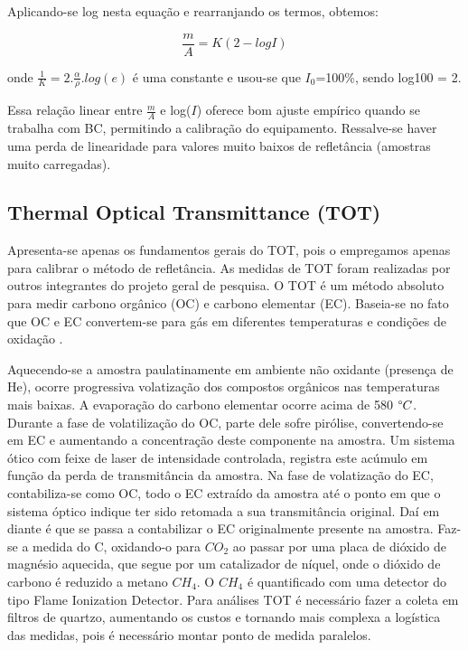 Aplicando-se log nesta equação e rearranjando os termos, obtemos:

\begin{equation}
  \label{m/a_2}
  \frac{m}{A} = K(2-logI) 
\end{equation}


onde $\frac{1}{K} = 2.\frac{\alpha}{\rho}.log(e)$
é uma constante e usou-se que $I_0$=100\%, sendo log100 = 2.

Essa relação linear entre $\frac{m}{A}$ e log($I$) oferece bom ajuste empírico 
quando se trabalha com BC, permitindo a calibração do equipamento. 
Ressalve-se haver uma perda de linearidade para valores muito baixos de 
refletância (amostras muito carregadas).  

\subsection{Thermal Optical Transmittance (TOT)}

Apresenta-se apenas os fundamentos gerais do TOT, pois o empregamos apenas para
calibrar o método de refletância. As medidas de TOT foram realizadas por outros
integrantes do projeto geral de pesquisa.
O TOT é um método absoluto para medir carbono orgânico (OC) e 
carbono elementar (EC). 
Baseia-se no fato que OC e EC convertem-se para gás em diferentes temperaturas 
e condições de oxidação \citep{birch1998}.

Aquecendo-se a amostra paulatinamente em ambiente não oxidante (presença de He),
ocorre progressiva volatização dos compostos orgânicos nas temperaturas mais 
baixas. A evaporação do carbono elementar ocorre acima de 580 $\degree C$.
Durante a fase de volatilização do OC, parte dele sofre pirólise, 
convertendo-se em EC e aumentando a concentração deste componente na amostra. 
Um sistema ótico com feixe de laser de intensidade controlada, registra este 
acúmulo em função da perda de transmitância da amostra.
Na fase de volatização do EC, contabiliza-se como OC, todo o EC extraído da 
amostra até o ponto em que o sistema óptico indique ter sido retomada a sua 
transmitância original. Daí em diante é que se passa a contabilizar o EC 
originalmente presente na amostra.
Faz-se a medida do C, oxidando-o para $CO_2$ ao passar por uma placa de dióxido
de magnésio aquecida, que segue por um catalizador de níquel, 
onde o dióxido de carbono é reduzido a metano $CH_4$. O $CH_4$ é quantificado 
com uma detector do tipo Flame Ionization Detector.
Para análises TOT é necessário fazer a coleta em filtros de quartzo, aumentando 
os custos e tornando mais complexa a logística das medidas, 
pois é necessário montar ponto de medida paralelos.

